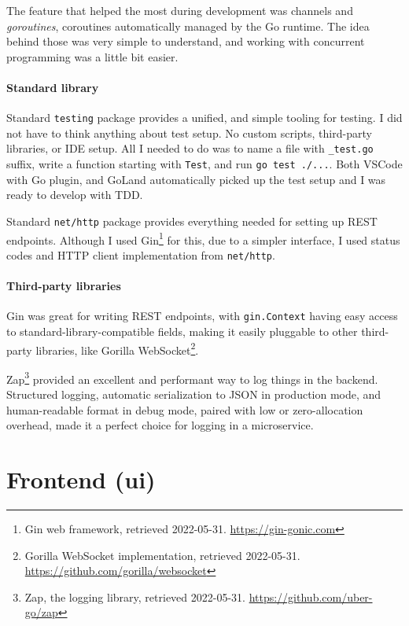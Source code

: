 The feature that helped the most during development was channels and
\emph{goroutines}, coroutines automatically managed by the Go runtime.
The idea behind those was very simple to understand, and working with
concurrent programming was a little bit easier.

\hypertarget{standard-library}{%
	\paragraph{Standard library}\label{standard-library}}

Standard \texttt{testing} package provides a unified, and simple tooling
for testing. I did not have to think anything about test setup. No
custom scripts, third-party libraries, or IDE setup. All I needed to do
was to name a file with \texttt{\_test.go} suffix, write a function
starting with \texttt{Test}, and run \texttt{go\ test\ ./...}. Both
VSCode with Go plugin, and GoLand automatically picked up the test setup
and I was ready to develop with TDD.

Standard \texttt{net/http} package provides everything needed for
setting up REST endpoints. Although I used Gin\footnote{Gin web
	framework, retrieved 2022-05-31. \url{https://gin-gonic.com}} for
this, due to a simpler interface, I used status codes and HTTP client
implementation from \texttt{net/http}.

\hypertarget{third-party-libraries}{%
	\paragraph{Third-party libraries}\label{third-party-libraries}}

Gin was great for writing REST endpoints, with \texttt{gin.Context}
having easy access to standard-library-compatible fields, making it
easily pluggable to other third-party libraries, like Gorilla
WebSocket\footnote{Gorilla WebSocket implementation, retrieved
	2022-05-31. \url{https://github.com/gorilla/websocket}}.

Zap\footnote{Zap, the logging library, retrieved 2022-05-31.
	\url{https://github.com/uber-go/zap}} provided an excellent and
performant way to log things in the backend. Structured logging,
automatic serialization to JSON in production mode, and human-readable
format in debug mode, paired with low or zero-allocation overhead, made
it a perfect choice for logging in a microservice.

\hypertarget{frontend-ui}{%
	\section{Frontend (ui)}\label{frontend-ui}}


